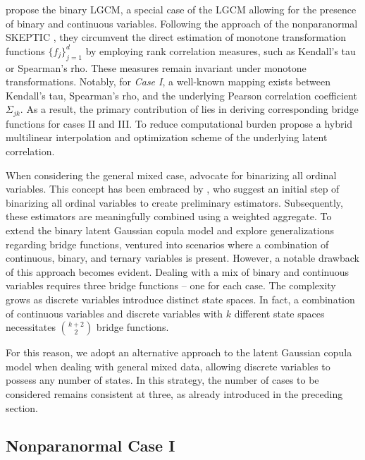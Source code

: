 
\citet{Fan17} propose the binary LGCM, a special case of the LGCM allowing for the presence of binary and continuous variables. Following the approach of the nonparanormal SKEPTIC \citep{Liu12}, they circumvent the direct estimation of monotone transformation functions $\{f_j\}_{j=1}^d$ by employing rank correlation measures, such as Kendall's tau or Spearman's rho. These measures remain invariant under monotone transformations. Notably, for \textit{Case I}, a well-known mapping exists between Kendall's tau, Spearman's rho, and the underlying Pearson correlation coefficient $\Sigma_{jk}$. As a result, the primary contribution of \citet{Fan17} lies in deriving corresponding bridge functions for cases II and III. To reduce computational burden \citet{Yoon21} propose a hybrid multilinear interpolation and optimization scheme of the underlying latent correlation.

When considering the general mixed case, \citet{Fan17} advocate for binarizing all ordinal variables. This concept has been embraced by \citet{Feng19}, who suggest an initial step of binarizing all ordinal variables to create preliminary estimators. Subsequently, these estimators are meaningfully combined using a weighted aggregate. To extend the binary latent Gaussian copula model and explore generalizations regarding bridge functions, \citet{Quan18} ventured into scenarios where a combination of continuous, binary, and ternary variables is present. However, a notable drawback of this approach becomes evident. Dealing with a mix of binary and continuous variables requires three bridge functions -- one for each case. The complexity grows as discrete variables introduce distinct state spaces. In fact, a combination of continuous variables and discrete variables with $k$ different state spaces necessitates $\binom{k+2}{2}$ bridge functions.

For this reason, we adopt an alternative approach to the latent Gaussian copula model when dealing with general mixed data, allowing discrete variables to possess any number of states. In this strategy, the number of cases to be considered remains consistent at three, as already introduced in the preceding section.

\subsection{Nonparanormal Case I}\label{sec::nonparanormal_case1}

